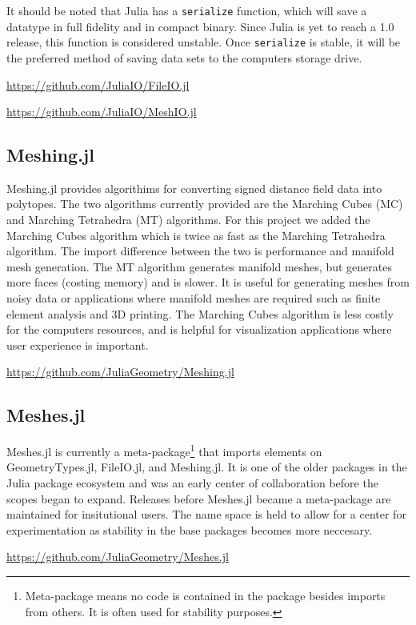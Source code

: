 It should be noted that Julia has a \texttt{serialize} function, which will
save a datatype in full fidelity and in compact binary. Since Julia is
yet to reach a 1.0 release, this function is considered unstable. Once
\texttt{serialize} is stable, it will be the preferred method of saving
data sets to the computers storage drive.

\url{https://github.com/JuliaIO/FileIO.jl}

\url{https://github.com/JuliaIO/MeshIO.jl}

\subsection{Meshing.jl}

Meshing.jl provides algorithims for converting signed distance field
data into polytopes. The two algorithms currently provided are
the Marching Cubes (MC) and Marching Tetrahedra (MT) algorithms. For this project
we added the Marching Cubes algorithm which is twice as fast as the
Marching Tetrahedra algorithm. The import difference between the two is
performance and manifold mesh generation. The MT algorithm generates manifold
meshes, but generates more faces (costing memory) and is slower.
It is useful for generating
meshes from noisy data or applications where manifold meshes are required
such as finite element analysis and 3D printing. The Marching Cubes algorithm
is less costly for the computers resources, and is helpful for visualization
applications where user experience is important.

\url{https://github.com/JuliaGeometry/Meshing.jl}

\subsection{Meshes.jl}

Meshes.jl is currently a meta-package\footnote{Meta-package means
no code is contained in the package besides imports from others. It is
often used for stability purposes.} that imports elements on GeometryTypes.jl,
FileIO.jl, and Meshing.jl. It is one of the older packages in the
Julia package ecosystem and was an early center of collaboration before
the scopes began to expand. Releases before Meshes.jl became a meta-package 
are maintained for insitutional users. The name space is held to
allow for a center for experimentation as stability in the base packages
becomes more neccesary.

\url{https://github.com/JuliaGeometry/Meshes.jl}

